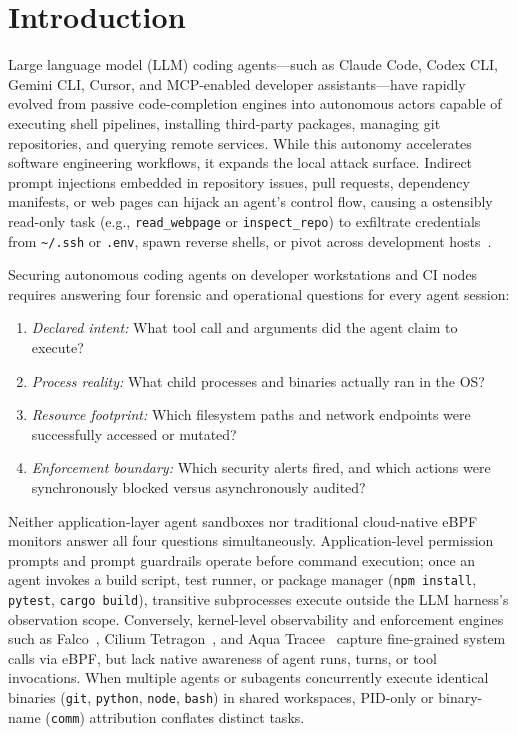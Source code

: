 \documentclass[10pt,twocolumn,letterpaper]{article}
\newcommand{\code}[1]{\texttt{\small #1}}
\begin{document}
\section{Introduction}
\label{sec:intro}

Large language model (LLM) coding agents---such as Claude Code, Codex CLI, Gemini CLI, Cursor, and MCP-enabled developer assistants---have rapidly evolved from passive code-completion engines into autonomous actors capable of executing shell pipelines, installing third-party packages, managing git repositories, and querying remote services. While this autonomy accelerates software engineering workflows, it expands the local attack surface. Indirect prompt injections embedded in repository issues, pull requests, dependency manifests, or web pages can hijack an agent's control flow, causing a ostensibly read-only task (e.g., \code{read\_webpage} or \code{inspect\_repo}) to exfiltrate credentials from \code{\textasciitilde/.ssh} or \code{.env}, spawn reverse shells, or pivot across development hosts~\cite{sope2026,flowseal2026,privacypeek2026}.

Securing autonomous coding agents on developer workstations and CI nodes requires answering four forensic and operational questions for every agent session:
\begin{enumerate}[label=(\roman*)]
  \item \emph{Declared intent:} What tool call and arguments did the agent claim to execute?
  \item \emph{Process reality:} What child processes and binaries actually ran in the OS?
  \item \emph{Resource footprint:} Which filesystem paths and network endpoints were successfully accessed or mutated?
  \item \emph{Enforcement boundary:} Which security alerts fired, and which actions were synchronously blocked versus asynchronously audited?
\end{enumerate}

Neither application-layer agent sandboxes nor traditional cloud-native eBPF monitors answer all four questions simultaneously. Application-level permission prompts and prompt guardrails operate before command execution; once an agent invokes a build script, test runner, or package manager (\code{npm install}, \code{pytest}, \code{cargo build}), transitive subprocesses execute outside the LLM harness's observation scope. Conversely, kernel-level observability and enforcement engines such as Falco~\cite{falco}, Cilium Tetragon~\cite{tetragon}, and Aqua Tracee~\cite{tracee} capture fine-grained system calls via eBPF, but lack native awareness of agent runs, turns, or tool invocations. When multiple agents or subagents concurrently execute identical binaries (\code{git}, \code{python}, \code{node}, \code{bash}) in shared workspaces, PID-only or binary-name (\code{comm}) attribution conflates distinct tasks.
\end{document}

